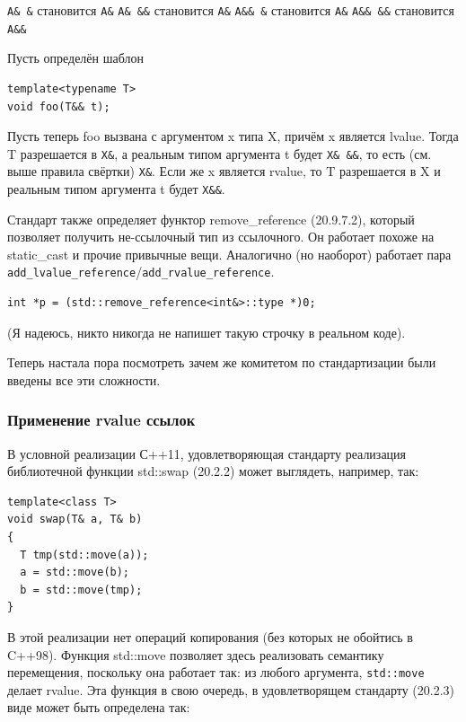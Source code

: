 \documentclass[a4paper,12pt,oneside]{article}
\begin{document}
\lstinline!A& &! становится \lstinline!A&!
\lstinline!A& &&! становится \lstinline!A&!
\lstinline!A&& &! становится \lstinline!A&!
\lstinline!A&& &&! становится \lstinline!A&&!

Пусть определён шаблон

\begin{lstlisting}
template<typename T>
void foo(T&& t);
\end{lstlisting}

Пусть теперь foo вызвана с аргументом x типа X, причём x является lvalue. Тогда T разрешается в \lstinline!X&!, а реальным типом аргумента t будет \lstinline!X& &&!, то есть (см. выше правила свёртки) \lstinline!X&!. Если же x является rvalue, то T разрешается в X и реальным типом аргумента t будет \lstinline!X&&!.

Стандарт также определяет функтор remove\_reference (20.9.7.2), который позволяет получить не-ссылочный тип из ссылочного. Он работает похоже на static\_cast и прочие привычные вещи. Аналогично (но наоборот) работает пара \lstinline!add_lvalue_reference!/\lstinline!add_rvalue_reference!.

\begin{lstlisting}
int *p = (std::remove_reference<int&>::type *)0;
\end{lstlisting}

(Я надеюсь, никто никогда не напишет такую строчку в реальном коде).

Теперь настала пора посмотреть зачем же комитетом по стандартизации были введены все эти сложности.

\subsubsection{Применение rvalue ссылок}

В условной реализации С++11, удовлетворяющая стандарту реализация библиотечной функции std::swap (20.2.2) может выглядеть, например, так:

\begin{lstlisting}
template<class T> 
void swap(T& a, T& b) 
{ 
  T tmp(std::move(a));
  a = std::move(b); 
  b = std::move(tmp);
} 
\end{lstlisting}

В этой реализации нет операций копирования (без которых не обойтись в C++98). Функция std::move позволяет здесь реализовать семантику перемещения, поскольку она работает так: из любого аргумента, \lstinline!std::move! делает rvalue. Эта функция в свою очередь, в удовлетворящем стандарту (20.2.3) виде может быть определена так:
\end{document}
